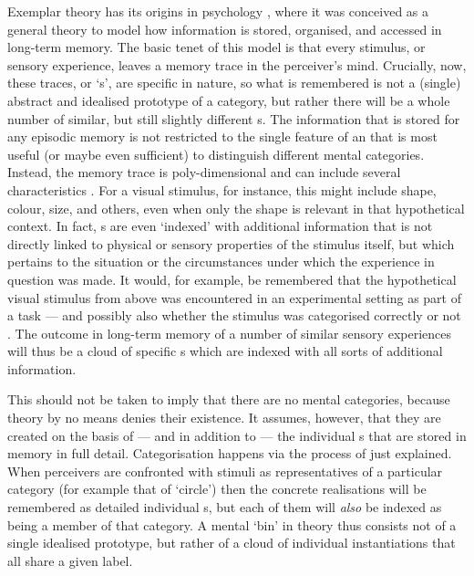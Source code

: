 Exemplar theory has its origins in psychology \parencite[cf.][]{medinschaffer1978}, where it was conceived as a general theory to model how information is stored, organised, and accessed in long-term memory.
The basic tenet of this model is that every stimulus, or sensory experience, leaves a memory trace in the perceiver's mind.
Crucially, now, these traces, or `s', are specific in nature, so what is remembered is not a (single) abstract and idealised prototype of a category, but rather there will be a whole number of similar, but still slightly different s.
The information that is stored for any episodic memory is not restricted to the single feature of an  that is most useful (or maybe even sufficient) to distinguish different mental categories.
Instead, the memory trace is poly-dimensional and can include several characteristics \parencite[cf.][517]{pierrehumbert2006}.
For a visual stimulus, for instance, this might include shape, colour, size, and others, even when only the shape is relevant in that hypothetical context.
In fact, s are even `indexed' with additional information that is not directly linked to physical or sensory properties of the stimulus itself, but which pertains to the situation or the circumstances under which the experience in question was made.
It would, for example, be remembered that the hypothetical visual stimulus from above was encountered in an experimental setting as part of a  task --- and possibly also whether the stimulus was categorised correctly or not \parencite[cf.][210--212]{medinschaffer1978}.
The outcome in long-term memory of a number of similar sensory experiences will thus be a cloud of specific s which are indexed with all sorts of additional information.

This should not be taken to imply that there are no mental categories, because  theory by no means denies their existence.
It assumes, however, that they are created on the basis of --- and in addition to --- the individual s that are stored in memory in full detail.
Categorisation happens via the process of  just explained.
When perceivers are confronted with stimuli as representatives of a particular category (for example that of `circle') then the concrete realisations will be remembered as detailed individual s, but each of them will \emph{also} be indexed as being a member of that category.
A mental `bin' in  theory thus consists not of a single idealised prototype, but rather of a cloud of individual instantiations that all share a given label.

